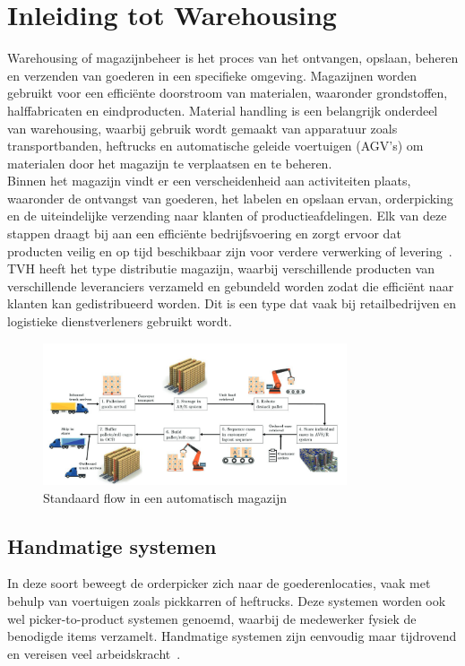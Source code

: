 \section{Inleiding tot Warehousing}
Warehousing of magazijnbeheer is het proces van het ontvangen, opslaan, beheren en verzenden van goederen in een specifieke omgeving. 
Magazijnen worden gebruikt voor een efficiënte doorstroom van materialen, waaronder grondstoffen, halffabricaten en eindproducten.
Material handling is een belangrijk onderdeel van warehousing, waarbij gebruik wordt gemaakt van apparatuur zoals 
transportbanden, heftrucks en automatische geleide voertuigen (AGV’s) om materialen door het magazijn te verplaatsen en te beheren.
\\
Binnen het magazijn vindt er een verscheidenheid aan activiteiten plaats, waaronder de ontvangst van goederen, 
het labelen en opslaan ervan, orderpicking en de uiteindelijke verzending naar klanten of productieafdelingen. 
Elk van deze stappen draagt bij aan een efficiënte bedrijfsvoering en zorgt ervoor dat producten veilig en op tijd beschikbaar 
zijn voor verdere verwerking of levering~\autocite{Berg1999}.
\\
TVH heeft het type distributie magazijn, waarbij verschillende producten van verschillende leveranciers verzameld  
en gebundeld worden zodat die efficiënt naar klanten kan gedistribueerd worden. 
Dit is een type dat vaak bij retailbedrijven en logistieke dienstverleners gebruikt wordt.

\begin{figure}
  \centering
  \includegraphics[width=0.8\textwidth]{../bachproef/img/warehousing_flow.png}
  \caption[Flow in a typical fully automated warehouse]{\label{fig:warehousing-flow}Standaard flow in een automatisch magazijn~\autocite{Koster2018}}
\end{figure}

\subsection{Handmatige systemen}
In deze soort beweegt de orderpicker zich naar de goederenlocaties, vaak met behulp van voertuigen zoals pickkarren of heftrucks. 
Deze systemen worden ook wel picker-to-product systemen genoemd, waarbij de medewerker fysiek de benodigde items verzamelt. 
Handmatige systemen zijn eenvoudig maar tijdrovend en vereisen veel arbeidskracht~\autocite{Berg1999}.

